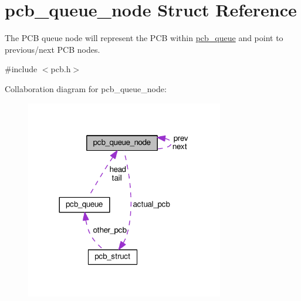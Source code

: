 \hypertarget{structpcb__queue__node}{}\section{pcb\+\_\+queue\+\_\+node Struct Reference}
\label{structpcb__queue__node}


The P\+CB queue node will represent the P\+CB within \hyperlink{structpcb__queue}{pcb\+\_\+queue} and point to previous/next P\+CB nodes.  




{\ttfamily \#include $<$pcb.\+h$>$}



Collaboration diagram for pcb\+\_\+queue\+\_\+node\+:\nopagebreak
\begin{figure}[H]
\begin{center}
\leavevmode
\includegraphics[width=245pt]{structpcb__queue__node__coll__graph}
\end{center}
\end{figure}
